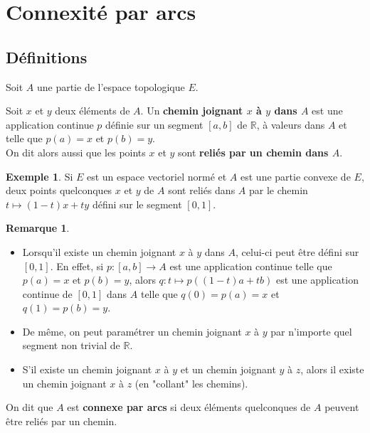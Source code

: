 \documentclass[french]{article}
\newcommand{\R}{\mathbb{R}}
\theoremstyle{plain}
\theoremstyle{definition}
\newtheorem*{ex}{Exemple}
\newtheorem*{rmq}{Remarque}
\theoremstyle{remark}
\begin{document}
\section{Connexité par arcs}

\subsection{Définitions}

Soit $A$ une partie de l'espace topologique $E$.

\begin{dfn}
	Soit $x$ et $y$ deux éléments de $A$. Un \textbf{chemin joignant $x$ à $y$ dans $A$} est une application continue $p$ définie sur un segment $[a,b]$ de $\R$, à valeurs dans $A$ et telle que $p(a)=x$ et $p(b)=y$. \\
	On dit alors aussi que les points $x$ et $y$ sont \textbf{reliés par un chemin dans $A$}.
\end{dfn}

\begin{ex}
	Si $E$ est un espace vectoriel normé et $A$ est une partie convexe de $E$, deux points quelconques $x$ et $y$ de $A$ sont reliés dans $A$ par le chemin $t\mapsto (1-t)x+ty$ défini sur le segment $[0,1]$.
\end{ex}

\begin{rmq}
	\begin{itemize}
		\item Lorsqu'il existe un chemin joignant $x$ à $y$ dans $A$, celui-ci peut être défini sur $[0,1]$. En effet, si $p:[a,b]\to A$ est une application continue telle que $p(a)=x$ et $p(b)=y$, alors $q:t\mapsto p((1-t)a+tb)$ est une application continue de $[0,1]$ dans $A$ telle que $q(0)=p(a)=x$ et $q(1)=p(b)=y$.
		\item De même, on peut paramétrer un chemin joignant $x$ à $y$ par n'importe quel segment non trivial de $\R$.
		\item S'il existe un chemin joignant $x$ à $y$ et un chemin joignant $y$ à $z$, alors il existe un chemin joignant $x$ à $z$ (en "collant" les chemins).
	\end{itemize}
\end{rmq}

\begin{dfn}
	On dit que $A$ est \textbf{connexe par arcs} si deux éléments quelconques de $A$ peuvent être reliés par un chemin.
\end{dfn}
\end{document}
